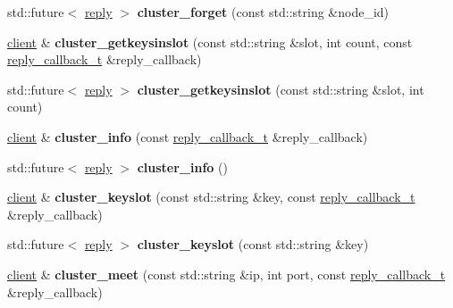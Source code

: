 \begin{DoxyCompactItemize}
std\+::future$<$ \hyperlink{classcpp__redis_1_1reply}{reply} $>$ {\bfseries cluster\+\_\+forget} (const std\+::string \&node\+\_\+id)
\item 
\mbox{\label{classcpp__redis_1_1client_a716e31987800e3ca5483f72972fecfb0}} 
\hyperlink{classcpp__redis_1_1client}{client} \& {\bfseries cluster\+\_\+getkeysinslot} (const std\+::string \&slot, int count, const \hyperlink{classcpp__redis_1_1client_a061a1140d36d2eaeda82b09a0bb3f9f2}{reply\+\_\+callback\+\_\+t} \&reply\+\_\+callback)
\item 
\mbox{\label{classcpp__redis_1_1client_ad644ef5c24f3eb51de30a827753cc077}} 
std\+::future$<$ \hyperlink{classcpp__redis_1_1reply}{reply} $>$ {\bfseries cluster\+\_\+getkeysinslot} (const std\+::string \&slot, int count)
\item 
\mbox{\label{classcpp__redis_1_1client_a831d52a9dc9115e817bae15db0fb18a6}} 
\hyperlink{classcpp__redis_1_1client}{client} \& {\bfseries cluster\+\_\+info} (const \hyperlink{classcpp__redis_1_1client_a061a1140d36d2eaeda82b09a0bb3f9f2}{reply\+\_\+callback\+\_\+t} \&reply\+\_\+callback)
\item 
\mbox{\label{classcpp__redis_1_1client_a993170e08c425a810fa757bd4c202d10}} 
std\+::future$<$ \hyperlink{classcpp__redis_1_1reply}{reply} $>$ {\bfseries cluster\+\_\+info} ()
\item 
\mbox{\label{classcpp__redis_1_1client_ae0314fc2697674f4be4fca1cc5cbd4a1}} 
\hyperlink{classcpp__redis_1_1client}{client} \& {\bfseries cluster\+\_\+keyslot} (const std\+::string \&key, const \hyperlink{classcpp__redis_1_1client_a061a1140d36d2eaeda82b09a0bb3f9f2}{reply\+\_\+callback\+\_\+t} \&reply\+\_\+callback)
\item 
\mbox{\label{classcpp__redis_1_1client_a5681ac2dfdacc19cde1a828d8b801df1}} 
std\+::future$<$ \hyperlink{classcpp__redis_1_1reply}{reply} $>$ {\bfseries cluster\+\_\+keyslot} (const std\+::string \&key)
\item 
\mbox{\label{classcpp__redis_1_1client_aefc94be1dc7eb11673ba92bc8cbffdcf}} 
\hyperlink{classcpp__redis_1_1client}{client} \& {\bfseries cluster\+\_\+meet} (const std\+::string \&ip, int port, const \hyperlink{classcpp__redis_1_1client_a061a1140d36d2eaeda82b09a0bb3f9f2}{reply\+\_\+callback\+\_\+t} \&reply\+\_\+callback)

\end{DoxyCompactItemize}

